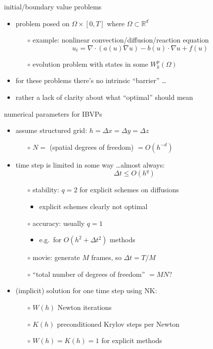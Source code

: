 \documentclass[hide notes,intlimits,usenames,dvipsnames]{beamer}
\newcommand{\RR}{\mathbb{R}}
\newcommand{\Div}{\nabla\cdot}
\newcommand{\grad}{\nabla}
\begin{document}
\begin{frame}{initial/boundary value problems}

\begin{itemize}
\item problem posed on $\Omega \times [0,T]$ where $\Omega \subset \RR^d$
    \begin{itemize}
    \item[$\circ$] example: nonlinear convection/diffusion/reaction equation
      $$u_t = \Div(a(u) \grad u) - b(u)\cdot \grad u + f(u)$$
    \item[$\circ$] evolution problem with states in some $W_k^p(\Omega)$
    \end{itemize}
\item for these problems there's no intrinsic ``barrier'' \dots
\item rather a lack of clarity about what ``optimal'' should mean
\end{itemize}
\end{frame}


\begin{frame}{numerical parameters for IBVPs}

\begin{itemize}
\item assume structured grid: $h=\Delta x = \Delta y=\Delta z$
    \begin{itemize}
    \item[$\circ$] $N=$ (spatial degrees of freedom) $=O(h^{-d})$
    \end{itemize}
\item time step is limited in some way \dots almost always:
    $$\Delta t \le O(h^q)$$
    \vspace{-5mm}
    \begin{itemize}
    \item[$\circ$] stability: $q=2$ for explicit schemes on diffusions
	    \begin{itemize}
	    \item explicit schemes clearly not optimal
	    \end{itemize}
    \item[$\circ$] accuracy: usually $q=1$
	    \begin{itemize}
	    \item e.g.~for $O(h^2+\Delta t^2)$ methods
	    \end{itemize}
    \item[$\circ$] movie: generate $M$ frames, so $\Delta t = T/M$
    \item[$\circ$] ``total number of degrees of freedom'' $=M N$?
    \end{itemize}
\item (implicit) solution for one time step using NK:
    \begin{itemize}
    \item[$\circ$] $W(h)$ Newton iterations
    \item[$\circ$] $K(h)$ preconditioned Krylov steps per Newton
    \item[$\circ$] $W(h)=K(h)=1$ for explicit methods
    \end{itemize}
\end{itemize}
\end{frame}
\end{document}

